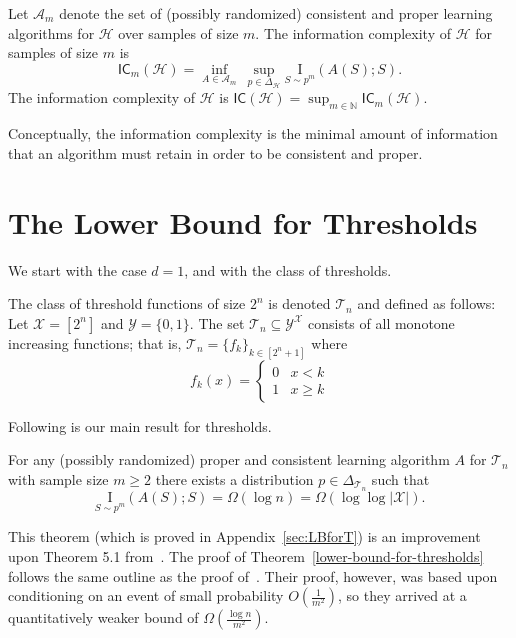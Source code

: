 \documentclass[final,12pt]{colt2018}
\newcommand{\mc}[1]{\mathcal{#1}}
\newcommand{\mb}{\mathbb}
\newcommand{\cH}{\mc{H}}
\newcommand{\cX}{\mc{X}}
\newcommand{\cY}{\mc{Y}}
\newcommand{\cA}{\mc{A}}
\newcommand{\cT}{\mc{T}}
\newcommand{\I}[2]{\underset{#1}{\mathrm{I}}\left(#2\right)}
\newcommand{\IC}{\mathsf{IC}}
\newcommand{\nin}{\noindent}
\begin{document}
\begin{definition}\label{definition-IC}
Let $\cA_m$ denote the set of (possibly randomized) consistent and proper learning algorithms for $\cH$ over samples of size $m$. {The information complexity of $\cH$ for samples of size $m$
is 
$$\IC_m(\cH) = \inf_{A \in \cA_m} \: \sup_{p \in \Delta_\cH} \I{S \sim p^m}{A(S);S}.$$}
The information complexity of $\cH$ is
$\IC(\cH) = \sup_{m \in \mb{N}} \IC_m(\cH)$.
\end{definition}

Conceptually,  the information complexity is the minimal amount of information that an algorithm must retain %
in order to be consistent and proper.

\section{The Lower Bound for Thresholds}\label{lower-thresholds}

{We start with the case $d=1$, and with the class of thresholds.}

\begin{definition}
	The {class of threshold functions of size $2^n$} is denoted $\cT_n$ and defined as follows:
	Let $\cX = [2^n]$ and $\cY=\{0,1\}$. The set $\cT_n\subseteq \cY^\cX$ consists of all monotone increasing functions; that is, $\cT_n = \{f_k\}_{k \in [2^n+1]}$ where
	\[
	f_k(x) = 
	\left\{
	\begin{array}{ll}
	0  & x < k \\
	1 & x \geq k
	\end{array}
	\right.
	\]
\end{definition}

\nin Following is our main result for thresholds.

\begin{theorem}\label{lower-bound-for-thresholds} 
For any (possibly randomized) proper and consistent learning algorithm $A$ for $\cT_n$ with sample size $m \geq 2$ there exists a distribution $p \in \Delta_{\cT_n}$ such that
	\[
	\I{S \sim p^m}{A(S);S} = \Omega(\log n) = \Omega(\log \log |\cX|) .
	\]
\end{theorem}

This theorem (which is proved in Appendix~\ref{sec:LBforT}) is an improvement upon Theorem 5.1 from~\cite{bassily2018learners}.
The proof of Theorem~\ref{lower-bound-for-thresholds} follows the same outline
as the proof of~\cite{bassily2018learners}.
Their proof, however, was based upon conditioning on an event of small probability $O(\frac{1}{m^2})$, so they arrived at a quantitatively weaker bound of $\Omega(\frac{\log n}{m^2})$. 
\end{document}
